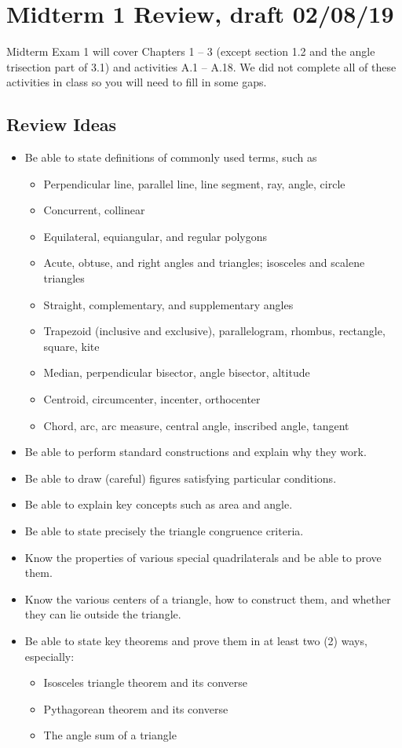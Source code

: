 \newpage

\section{Midterm 1 Review, draft 02/08/19}
Midterm Exam 1 will cover Chapters 1 -- 3 (except section 1.2 and the angle trisection part of 3.1) and activities A.1 -- A.18.  We did not complete all of these activities in class so you will need to fill in some gaps.  
\subsection{Review Ideas}

\begin{itemize}\itemsep0em
\item Be able to state definitions of commonly used terms, such as 
\begin{itemize}
\item Perpendicular line, parallel line, line segment, ray, angle, circle
\item Concurrent, collinear
\item Equilateral, equiangular, and regular polygons
\item Acute, obtuse, and right angles and triangles; isosceles and scalene triangles
\item Straight, complementary, and supplementary angles
\item Trapezoid (inclusive and exclusive), parallelogram, rhombus, rectangle, square, kite
\item Median, perpendicular bisector, angle bisector, altitude
\item Centroid, circumcenter, incenter, orthocenter
\item Chord, arc, arc measure, central angle, inscribed angle, tangent
\end{itemize}
\item Be able to perform standard constructions and explain why they work. 
\item Be able to draw (careful) figures satisfying particular conditions.  
\item Be able to explain key concepts such as area and angle.   
\item Be able to state precisely the triangle congruence criteria. 
\item Know the properties of various special quadrilaterals and be able to prove them.  
\item Know the various centers of a triangle, how to construct them, and whether they can lie outside the triangle.  
\item Be able to state key theorems and prove them in at least two (2) ways, especially:  
\begin{itemize}
\item Isosceles triangle theorem and its converse
\item Pythagorean theorem and its converse
\item The angle sum of a triangle 
\end{itemize}
\end{itemize}

